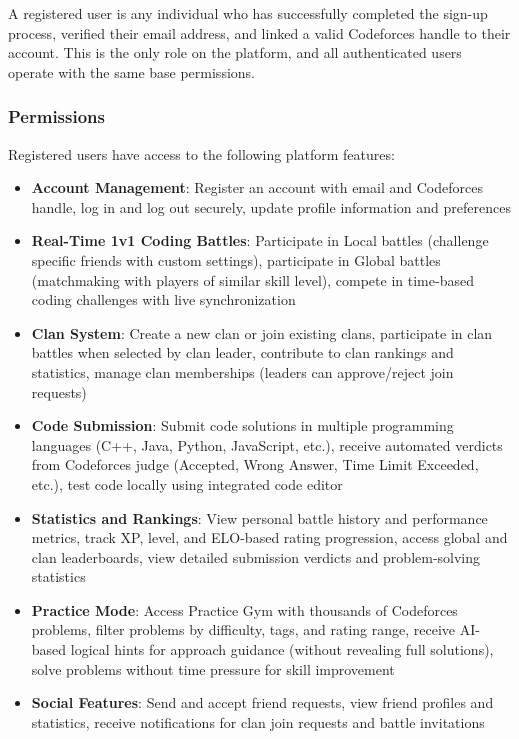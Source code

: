 \documentclass[12pt,a4paper]{article}
\begin{document}
A registered user is any individual who has successfully completed the sign-up process, verified their email address, and linked a valid Codeforces handle to their account. This is the only role on the platform, and all authenticated users operate with the same base permissions.

\subsubsection{Permissions}

Registered users have access to the following platform features:

\begin{itemize}[leftmargin=*]
\item \textbf{Account Management}: Register an account with email and Codeforces handle, log in and log out securely, update profile information and preferences
\item \textbf{Real-Time 1v1 Coding Battles}: Participate in Local battles (challenge specific friends with custom settings), participate in Global battles (matchmaking with players of similar skill level), compete in time-based coding challenges with live synchronization
\item \textbf{Clan System}: Create a new clan or join existing clans, participate in clan battles when selected by clan leader, contribute to clan rankings and statistics, manage clan memberships (leaders can approve/reject join requests)
\item \textbf{Code Submission}: Submit code solutions in multiple programming languages (C++, Java, Python, JavaScript, etc.), receive automated verdicts from Codeforces judge (Accepted, Wrong Answer, Time Limit Exceeded, etc.), test code locally using integrated code editor
\item \textbf{Statistics and Rankings}: View personal battle history and performance metrics, track XP, level, and ELO-based rating progression, access global and clan leaderboards, view detailed submission verdicts and problem-solving statistics
\item \textbf{Practice Mode}: Access Practice Gym with thousands of Codeforces problems, filter problems by difficulty, tags, and rating range, receive AI-based logical hints for approach guidance (without revealing full solutions), solve problems without time pressure for skill improvement
\item \textbf{Social Features}: Send and accept friend requests, view friend profiles and statistics, receive notifications for clan join requests and battle invitations
\end{itemize}
\end{document}
